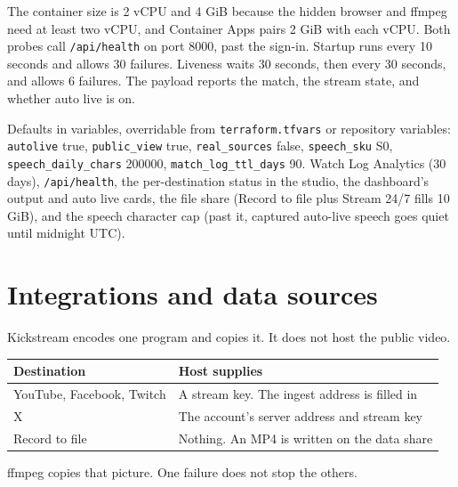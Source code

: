 \documentclass[11pt]{article}
\begin{document}
The container size is 2 vCPU and 4 GiB because the hidden browser and ffmpeg need
at least two vCPU, and Container Apps pairs 2 GiB with each vCPU.
Both probes call \texttt{/api/health} on port 8000, past the sign-in.
Startup runs every 10 seconds and allows 30 failures.
Liveness waits 30 seconds, then every 30 seconds, and allows 6 failures.
The payload reports the match, the stream state, and whether auto live is on.

Defaults in variables, overridable from \texttt{terraform.tfvars} or repository variables:
\texttt{autolive} true, \texttt{public\_view} true, \texttt{real\_sources} false,
\texttt{speech\_sku} S0, \texttt{speech\_daily\_chars} 200000,
\texttt{match\_log\_ttl\_days} 90.
Watch Log Analytics (30 days), \texttt{/api/health}, the per-destination status
in the studio, the dashboard's output and auto live cards, the file share (Record
to file plus Stream 24/7 fills 10 GiB), and the speech character cap (past it,
captured auto-live speech goes quiet until midnight UTC).

\section{Integrations and data sources}

Kickstream encodes one program and copies it.
It does not host the public video.

\begin{tabularx}{\textwidth}{@{}lX@{}}
\toprule
Destination & Host supplies \\
\midrule
YouTube, Facebook, Twitch & A stream key. The ingest address is filled in \\
X & The account's server address and stream key \\
Record to file & Nothing. An MP4 is written on the data share \\
\bottomrule
\end{tabularx}

\begin{center}
\end{center}
{\small\color{Muted} ffmpeg copies that picture. One failure does not stop the others.\par}
\end{document}
